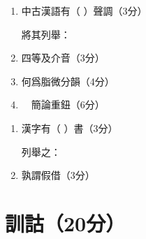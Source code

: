 \documentclass[12pt,a4paper]{article}
\begin{document}
\vspace{1em}

\begin{enumerate}[leftmargin=*, label=\textbf{\arabic*.}, start=6]
    \item 中古漢語有（ ）聲調（3分）
    
    將其列舉：
    \item 四等及介音（3分）
    
    \item 何爲脂微分韻（4分）
    
    \vspace{8em}
    
    \item　簡論重鈕（6分）
    
    \vspace{10em}
\end{enumerate}
\vspace{1em}

\begin{enumerate}[leftmargin=*, label=\textbf{\arabic*.}, start=10]

    
\section{文字（35分）}

    \item 漢字有（ ）書（3分）
    
  列舉之：  
    \item 孰謂假借（3分）
 
\end{enumerate}


\section{訓詁（20分）}
\end{document}
